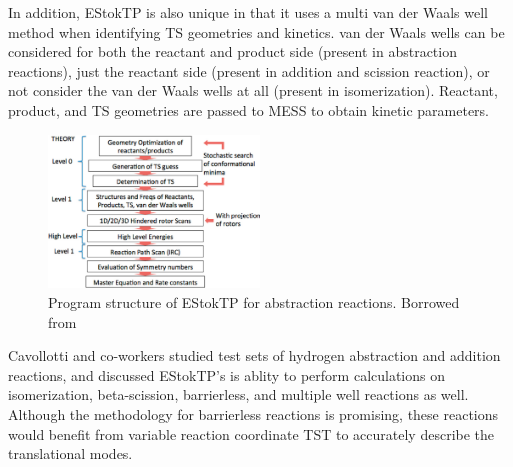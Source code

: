\documentclass[preprint, 11pt]{elsarticle} %
\begin{document}
In addition, EStokTP is also unique in that it uses a multi van der Waals well method when identifying TS geometries and kinetics.
van der Waals wells can be considered for both the reactant and product side (present in abstraction reactions), just the reactant side (present in addition and scission reaction), or not consider the van der Waals wells at all (present in isomerization).
Reactant, product, and TS geometries are passed to MESS \cite{MESS:2013} to obtain kinetic parameters.


\begin{figure}[htbp]
    \centering
    \includegraphics[width=0.5\textwidth]{estoktp}
    \caption{Program structure of EStokTP for abstraction reactions. Borrowed from \cite{Cavallotti:2019jctc}}
    \label{fig:estoktp_structure}
\end{figure}

Cavollotti and co-workers studied test sets of hydrogen abstraction and addition reactions, and discussed EStokTP's is ablity to perform calculations on isomerization, beta-scission, barrierless, and multiple well reactions as well.
Although the methodology for barrierless reactions is promising, these reactions would benefit from variable reaction coordinate TST to accurately describe the translational modes.
\end{document}
